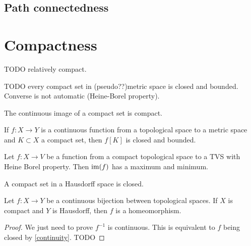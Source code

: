 \subsection{Path connectedness}

\section{Compactness}
TODO relatively compact.

TODO every compact set in (pseudo??)metric space is closed and bounded. Converse is not automatic (Heine-Borel property).

\begin{proposition} \label{imageCompactIsCompact}
The continuous image of a compact set is compact.
\end{proposition}
\begin{corollary} \label{imageCompactIsClosedBounded}
If $f:X\to Y$ is a continuous function from a topological space to a metric space and $K\subset X$ a compact set, then $f[K]$ is closed and bounded.
\end{corollary}
\begin{corollary}
Let $f:X\to V$ be a function from a compact topological space to a TVS with Heine Borel property. Then $\operatorname{im}(f)$ has a maximum and minimum.
\end{corollary}

\begin{proposition}
A compact set in a Hausdorff space is closed.
\end{proposition}

\begin{proposition} \label{compactToHausdorffHomeomorphism}
Let $f:X\to Y$ be a continuous bijection between topological spaces. If $X$ is compact and $Y$ is Hausdorff, then $f$ is a homeomorphism.
\end{proposition}
\begin{proof}
We just need to prove $f^{-1}$ is continuous. This is equivalent to $f$ being closed by \ref{continuity}. TODO
\end{proof}

